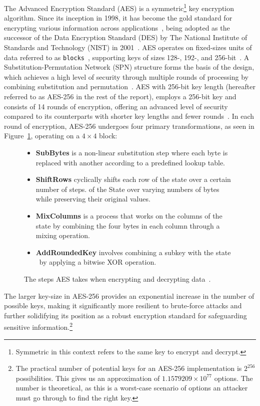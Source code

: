 The Advanced Encryption Standard (AES) is a symmetric\footnote{
  Symmetric in this context refers to the same key to encrypt and
  decrypt.
} key encryption algorithm.
Since its inception in 1998, it has become the gold standard for encrypting various
information across applications~\cite{schneier2015applied,rijndael_book}, being
adopted as the successor of the Data Encryption Standard (DES) by The National
Institute of Standards and Technology (NIST) in 2001~\cite{nist_aes_winner}.
AES operates on fixed-sizes units of data referred to as \texttt{blocks}~\cite{nistfips197blocks},
supporting keys of sizes 128-, 192-, and 256-bit~\cite{nistfips197intro}.
A Substitution-Permutation Network (SPN) structure forms the basis of the design,
which achieves a high level of security through multiple rounds of processing by
combining substitution and permutation~\cite{nistfips197specification}.
AES with 256-bit key length (hereafter referred to as AES-256 in the rest
of the report), employs a 256-bit key and consists of 14 rounds of encryption,
offering an advanced level of security compared to its counterparts with shorter
key lengths and fewer rounds~\cite{nistfips197256}.
In each round of encryption, AES-256 undergoes four primary transformations,
as seen in Figure~\ref{fig:aessteps}, operating on a $4\times4$ block:
\begin{figure}[htbp]
  \begin{itemize}
    \item \textbf{SubBytes} is a non-linear substitution step where each byte is
    replaced with another according to a predefined lookup table.
    \item \textbf{ShiftRows} cyclically shifts each row of the state over a
    certain number of steps.
    of the State over varying numbers of bytes while preserving their original
    values.
    \item \textbf{MixColumns} is a process that works on the columns of the
    state by combining the four bytes in each column through a mixing operation.
    \item \textbf{AddRoundedKey} involves combining a subkey with the state\protect\footnotemark
    ~by applying a bitwise XOR operation.
  \end{itemize}
  \caption{The steps AES takes when encrypting and decrypting data~\cite{nistfips197specification}.}
  \label{fig:aessteps}
\end{figure}
\newline
The larger key-size in AES-256 provides an exponential increase in the number of
possible keys, making it significantly more resilient to brute-force attacks
and further solidifying its position as a robust encryption standard for
safeguarding sensitive information.\footnote{
  The practical number of potential keys for an AES-256 implementation is
  $2^{256}$ possibilities. This gives us an approximation of $1.1579209 \times 10^{77}$
  options.
  The number is theoretical, as this is a worst-case scenario of options an
  attacker must go through to find the right key.
}

